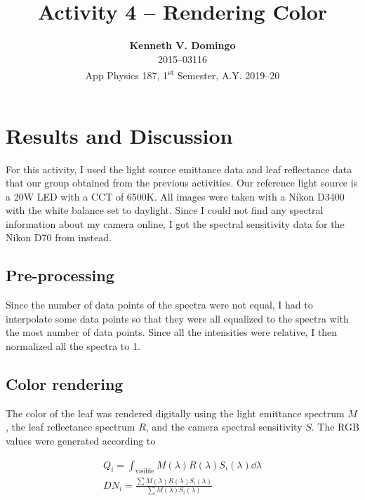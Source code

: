 \documentclass[12pt,a4paper]{article}
\newcommand{\activity}{Activity 4 -- Rendering Color}
\begin{document}
\title{\TitleFont \activity}
\author[ ]{\textbf{Kenneth V. Domingo} \\
2015--03116 \\
App Physics 187, 1\textsuperscript{st} Semester, A.Y. 2019--20}

\maketitle
\thispagestyle{titlestyle}

\section*{Results and Discussion}
\setcounter{section}{1}

For this activity, I used the light source emittance data and leaf reflectance data that our group obtained from the previous activities. Our reference light source is a 20W LED with a CCT of 6500K. All images were taken with a Nikon D3400 with the white balance set to daylight. Since I could not find any spectral information about my camera online, I got the spectral sensitivity data for the Nikon D70 from \cite{naelab} instead.

\subsection{Pre-processing}
Since the number of data points of the spectra were not equal, I had to interpolate some data points so that they were all equalized to the spectra with the most number of data points. Since all the intensities were relative, I then normalized all the spectra to 1.

\subsection{Color rendering}
The color of the leaf was rendered digitally using the light emittance spectrum $M$, the leaf reflectance spectrum $R$, and the camera spectral sensitivity $S$. The RGB values were generated according to \cite{soriano}

\begin{eqnarray}
	Q_i = \int_{\mathrm{visible}} M(\lambda) R(\lambda) S_i(\lambda) \dd{\lambda} \label{eq:sensor-model-integrate} \\
	DN_i = \frac{\sum M(\lambda) R(\lambda) S_i(\lambda)}{\sum M(\lambda) S_i(\lambda)} \label{eq:sensor-model-sum}
\end{eqnarray}
\end{document}

